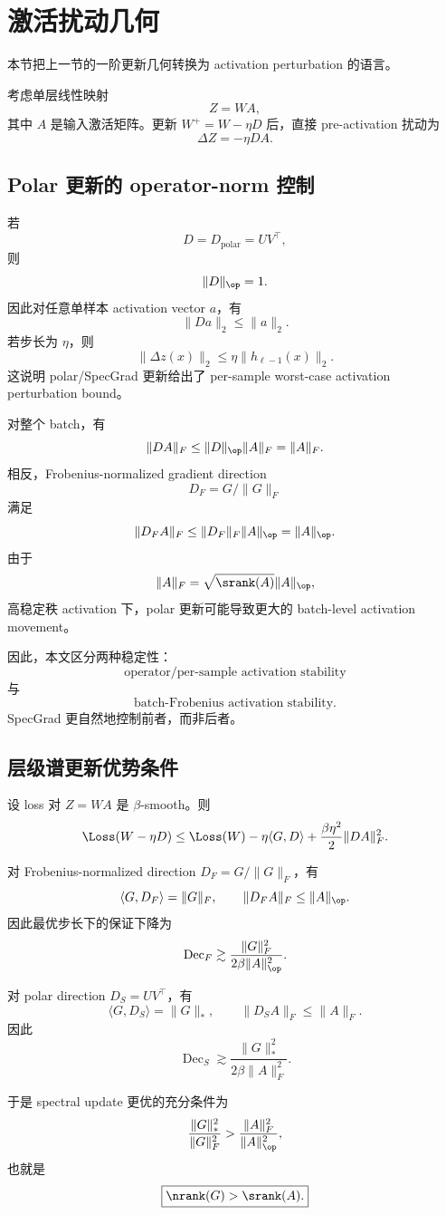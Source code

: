 \section{激活扰动几何}

本节把上一节的一阶更新几何转换为 activation perturbation 的语言。

考虑单层线性映射
\[
Z=WA,
\]
其中 \(A\) 是输入激活矩阵。更新 \(W^+=W-\eta D\) 后，直接 pre-activation 扰动为
\[
\Delta Z=-\eta DA.
\]

\subsection{Polar 更新的 operator-norm 控制}

若
\[
D=D_{\mathrm{polar}}=UV^\top,
\]
则
\[
\|D\|_{\op}=1.
\]
因此对任意单样本 activation vector \(a\)，有
\[
\|Da\|_2\le \|a\|_2.
\]
若步长为 \(\eta\)，则
\[
\|\Delta z(x)\|_2\le \eta\|h_{\ell-1}(x)\|_2.
\]
这说明 polar/SpecGrad 更新给出了 per-sample worst-case activation perturbation bound。

对整个 batch，有
\[
\|DA\|_F\le \|D\|_{\op}\|A\|_F=\|A\|_F.
\]
相反，Frobenius-normalized gradient direction
\[
D_F=G/\|G\|_F
\]
满足
\[
\|D_FA\|_F\le \|D_F\|_F\|A\|_{\op}=\|A\|_{\op}.
\]
由于
\[
\|A\|_F=\sqrt{\srank(A)}\|A\|_{\op},
\]
高稳定秩 activation 下，polar 更新可能导致更大的 batch-level activation movement。

因此，本文区分两种稳定性：
\[
\boxed{\text{operator/per-sample activation stability}}
\]
与
\[
\boxed{\text{batch-Frobenius activation stability}.}
\]
SpecGrad 更自然地控制前者，而非后者。

\subsection{层级谱更新优势条件}

设 loss 对 \(Z=WA\) 是 \(\beta\)-smooth。则
\[
\Loss(W-\eta D)
\le
\Loss(W)-\eta\langle G,D\rangle+\frac{\beta\eta^2}{2}\|DA\|_F^2.
\]

对 Frobenius-normalized direction \(D_F=G/\|G\|_F\)，有
\[
\langle G,D_F\rangle=\|G\|_F,
\qquad
\|D_FA\|_F\le \|A\|_{\op}.
\]
因此最优步长下的保证下降为
\[
\operatorname{Dec}_F\gtrsim
\frac{\|G\|_F^2}{2\beta\|A\|_{\op}^2}.
\]

对 polar direction \(D_S=UV^\top\)，有
\[
\langle G,D_S\rangle=\|G\|_*,
\qquad
\|D_SA\|_F\le \|A\|_F.
\]
因此
\[
\operatorname{Dec}_S\gtrsim
\frac{\|G\|_*^2}{2\beta\|A\|_F^2}.
\]

于是 spectral update 更优的充分条件为
\[
\frac{\|G\|_*^2}{\|G\|_F^2}
>
\frac{\|A\|_F^2}{\|A\|_{\op}^2},
\]
也就是
\[
\boxed{\nrank(G)>\srank(A).}
\]

